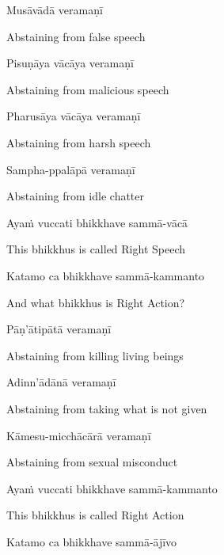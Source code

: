 Musāvādā veramaṇī

\begin{english}
  Abstaining from false speech
\end{english}

Pisuṇāya vācāya veramaṇī

\begin{english}
  Abstaining from malicious speech
\end{english}

Pharusāya vācāya veramaṇī

\begin{english}
  Abstaining from harsh speech
\end{english}

Sampha-ppalāpā veramaṇī

\begin{english}
  Abstaining from idle chatter
\end{english}

Ayaṁ vuccati bhikkhave sammā-vācā

\begin{english}
  This bhikkhus is called Right Speech
\end{english}

Katamo ca bhikkhave sammā-kammanto

\begin{english}
  And what bhikkhus is Right Action?
\end{english}

Pāṇ'ātipātā veramaṇī

\begin{english}
  Abstaining from killing living beings
\end{english}

Adinn'ādānā veramaṇī

\begin{english}
  Abstaining from taking what is not given
\end{english}

Kāmesu-micchācārā veramaṇī

\begin{english}
  Abstaining from sexual misconduct
\end{english}

Ayaṁ vuccati bhikkhave sammā-kammanto

\begin{english}
  This bhikkhus is called Right Action
\end{english}

Katamo ca bhikkhave sammā-ājīvo

